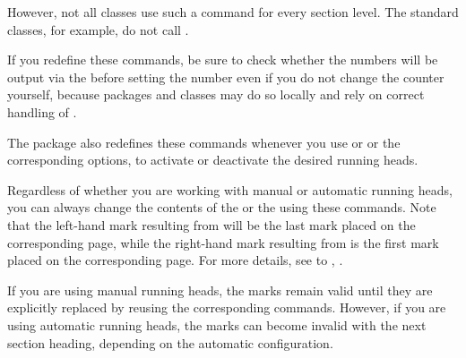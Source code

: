   However, not all classes use such a command for
  every section level. The standard classes, for example, do not call 
  .
  
  If you redefine these commands, be sure to check
  whether the numbers will be output via the
   before setting the number even if you
  do not change the  counter yourself,
  because packages and classes may do so locally and rely on correct handling
  of .

  The  package also redefines these commands whenever you use
   or  or the
  corresponding options, to activate or deactivate the desired running heads.%
  \EndIndexGroup


  \begin{Declaration}
  \end{Declaration}
  Regardless of whether you are working with manual or automatic running 
  heads, you can always change the contents of the  or the
   using these commands. Note that the left-hand mark
  resulting from %
   will be the last mark placed on the
  corresponding page, while the right-hand mark resulting from
   is the
  first mark placed on the corresponding page. For more details, see
   to
  ,
  .

  If you are using manual running heads, the marks
  remain valid until they are explicitly replaced by reusing the corresponding
  commands. However, if you are using automatic running heads, the marks can
  become invalid with the next section heading, depending on the automatic
  configuration.

